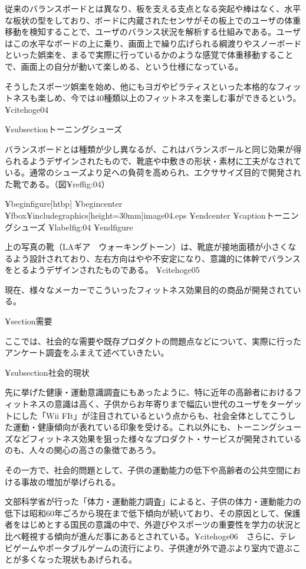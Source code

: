 従来のバランスボードとは異なり、板を支える支点となる突起や棒はなく、水平な板状の型をしており、ボードに内蔵されたセンサがその板上でのユーザの体重移動を検知することで、ユーザのバランス状況を解析する仕組みである。ユーザはこの水平なボードの上に乗り、画面上で繰り広げられる綱渡りやスノーボードといった娯楽を、まるで実際に行っているかのような感覚で体重移動することで、画面上の自分が動いて楽しめる、という仕様になっている。

そうしたスポーツ娯楽を始め、他にもヨガやピラティスといった本格的なフィットネスも楽しめ、今では40種類以上のフィットネスを楽しむ事ができるという。 ¥cite{hoge04}



¥subsection{トーニングシューズ}

バランスボードとは種類が少し異なるが、これはバランスボールと同じ効果が得られるようデザインされたもので、靴底や中敷きの形状・素材に工夫がなされている。通常のシューズより足への負荷を高められ、エクササイズ目的で開発された靴である。（図¥ref{fig:04}）


¥begin{figure}[htbp]
    ¥begin{center}
       ¥fbox{¥includegraphics[height=30mm]{image04.eps}}
    ¥end{center}
    ¥caption{トーニングシューズ}
    ¥label{fig:04}
¥end{figure}


上の写真の靴（LAギア　ウォーキングトーン）は、靴底が接地面積が小さくなるよう設計されており、左右方向はやや不安定になり、意識的に体幹でバランスをとるようデザインされたものである。 ¥cite{hoge05}

現在、様々なメーカーでこういったフィットネス効果目的の商品が開発されている。




¥section{需要}

ここでは、社会的な需要や既存プロダクトの問題点などについて、実際に行ったアンケート調査をふまえて述べていきたい。

¥subsection{社会的現状}

先に挙げた健康・運動意識調査にもあったように、特に近年の高齢者におけるフィットネスの意識は高く、子供からお年寄りまで幅広い世代のユーザをターゲットにした「Wii FIt」が注目されているという点からも、社会全体としてこうした運動・健康傾向が表れている印象を受ける。これ以外にも、トーニングシューズなどフィットネス効果を狙った様々なプロダクト・サービスが開発されているのも、人々の関心の高さの象徴であろう。

その一方で、社会的問題として、子供の運動能力の低下や高齢者の公共空間における事故の増加が挙げられる。

文部科学省が行った「体力・運動能力調査」によると、子供の体力・運動能力の低下は昭和60年ごろから現在まで低下傾向が続いており、その原因として、保護者をはじめとする国民の意識の中で、外遊びやスポーツの重要性を学力の状況と比べ軽視する傾向が進んだ事にあるとされている。¥cite{hoge06}　さらに、テレビゲームやポータブルゲームの流行により、子供達が外で遊ぶより室内で遊ぶことが多くなった現状もあげられる。

